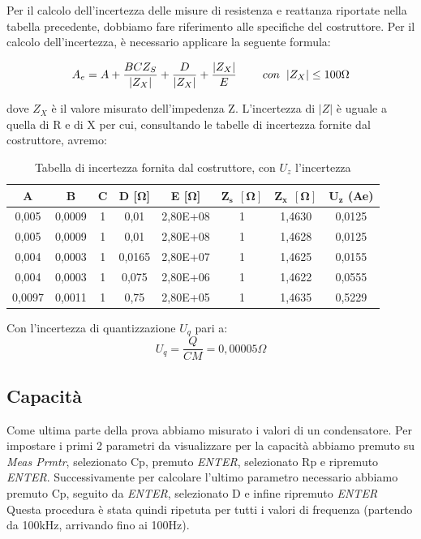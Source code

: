 Per il calcolo dell'incertezza delle misure di resistenza e reattanza riportate nella tabella precedente, dobbiamo fare riferimento alle specifiche del costruttore. Per il calcolo dell'incertezza, è necessario applicare la seguente formula:

\begin{equation}
    A_e = A + \frac{BCZ_S}{|Z_X|} + \frac{D}{|Z_X|} + \frac{|Z_X|}{E} \hspace{0,8cm} con \hspace{0,2cm} |Z_X| \leq 100\Omega
\end{equation}

dove $Z_X$ è il valore misurato dell’impedenza Z. L’incertezza di $|Z|$ è uguale a quella di 
R e di X per cui, consultando le tabelle di incertezza fornite dal costruttore, avremo:


\begin{table}[!ht]
\centering
\begin{tabular}{|c|c|c|c|c|c|c|c|}
\hline
\textbf{A}      & \textbf{B}      & \textbf{C} & \textbf{D [$\bm{\Omega}$]} & \textbf{E [$\bm{\Omega}$]}  & $\bm{Z_s \ \ [\Omega]}$ & $\bm{Z_x \ \ [\Omega]}$ & $\bm{U_z}$ \textbf{(Ae)} \\ \hline
0,005  & 0,0009 & 1 & 0,01      & 2,80E+08  & 1          & 1,4630     & 0,0125  \\ \hline
0,005  & 0,0009 & 1 & 0,01      & 2,80E+08  & 1          & 1,4628     & 0,0125  \\ \hline
0,004  & 0,0003 & 1 & 0,0165    & 2,80E+07  & 1          & 1,4625     & 0,0155  \\ \hline
0,004  & 0,0003 & 1 & 0,075     & 2,80E+06  & 1          & 1,4622     & 0,0555  \\ \hline
0,0097 & 0,0011 & 1 & 0,75      & 2,80E+05  & 1          & 1,4635     & 0,5229  \\ \hline
\end{tabular}
\caption{Tabella di incertezza fornita dal costruttore, con $U_z$ l'incertezza}
\label{tab:lcr_z_sheet}
\end{table}
\FloatBarrier

Con l'incertezza di quantizzazione $U_q$ pari a:
\begin{equation}
    U_q = \frac{Q}{CM} = 0,00005 \Omega
\end{equation}



\subsection{Capacità}
\label{sub:c}
Come ultima parte della prova abbiamo misurato i valori di un condensatore.
Per impostare i primi 2 parametri da visualizzare per la capacità abbiamo premuto su \emph{Meas Prmtr}, selezionato Cp, premuto \emph{ENTER}, selezionato Rp e ripremuto \emph{ENTER}. Successivamente per calcolare l'ultimo parametro necessario abbiamo premuto Cp, seguito da \emph{ENTER}, selezionato D e infine ripremuto \emph{ENTER}
Questa procedura è stata quindi ripetuta per tutti i valori di frequenza (partendo da 100kHz, arrivando fino ai 100Hz).


